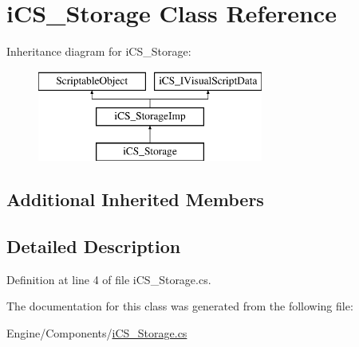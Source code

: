 \hypertarget{classi_c_s___storage}{\section{i\+C\+S\+\_\+\+Storage Class Reference}
\label{classi_c_s___storage}
}
Inheritance diagram for i\+C\+S\+\_\+\+Storage\+:\begin{figure}[H]
\begin{center}
\leavevmode
\includegraphics[height=3.000000cm]{classi_c_s___storage}
\end{center}
\end{figure}
\subsection*{Additional Inherited Members}


\subsection{Detailed Description}


Definition at line 4 of file i\+C\+S\+\_\+\+Storage.\+cs.



The documentation for this class was generated from the following file\+:\begin{DoxyCompactItemize}
\item 
Engine/\+Components/\hyperlink{i_c_s___storage_8cs}{i\+C\+S\+\_\+\+Storage.\+cs}\end{DoxyCompactItemize}
